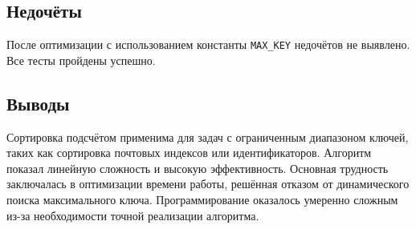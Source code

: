 \documentclass[12pt]{article}
\begin{document}
\subsection*{Недочёты}

После оптимизации с использованием константы \texttt{MAX\_KEY} недочётов не выявлено. Все тесты пройдены успешно.

\subsection*{Выводы}

Сортировка подсчётом применима для задач с ограниченным диапазоном ключей, таких как сортировка почтовых индексов или идентификаторов. Алгоритм показал линейную сложность и высокую эффективность. Основная трудность заключалась в оптимизации времени работы, решённая отказом от динамического поиска максимального ключа. Программирование оказалось умеренно сложным из-за необходимости точной реализации алгоритма.
\end{document}
